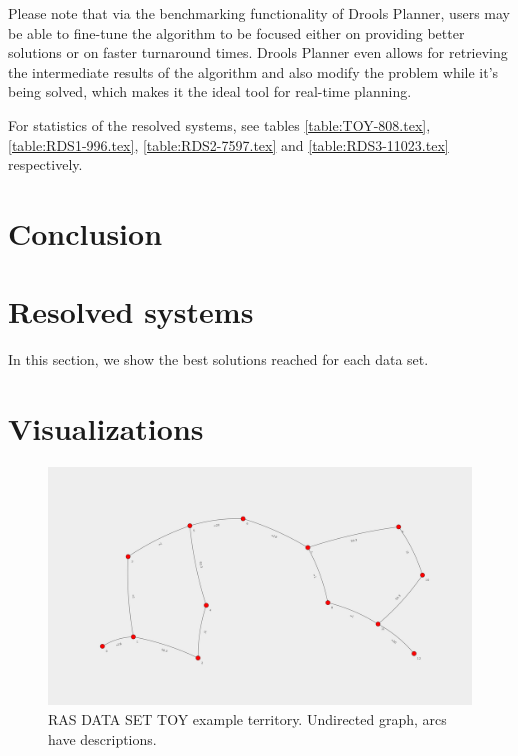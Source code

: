 \documentclass[10pt,a4paper,draft]{article}
\begin{document}
Please note that via the benchmarking functionality of Drools Planner, users may be able to fine-tune the algorithm to be focused either on providing better solutions or on faster turnaround times. Drools Planner even allows for retrieving the intermediate results of the algorithm and also modify the problem while it's being solved, which makes it the ideal tool for real-time planning.

For statistics of the resolved systems, see tables \ref{table:TOY-808.tex}, \ref{table:RDS1-996.tex}, \ref{table:RDS2-7597.tex} and \ref{table:RDS3-11023.tex} respectively. 

\section{Conclusion}

\appendix

\section{Resolved systems}

In this section, we show the best solutions reached for each data set. 






\section{Visualizations}

\begin{figure}
\centering
\includegraphics[width=150mm,angle=90]{solution.png}
\caption{RAS DATA SET TOY example territory. Undirected graph, arcs have descriptions.}
\end{figure}
\end{document}

